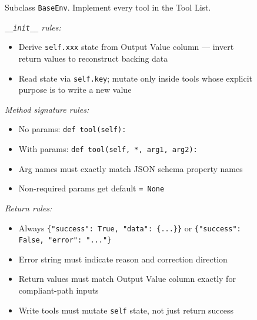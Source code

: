 \begin{figure}[p]
\begin{tcolorbox}[
    enhanced,
    colback=gray!5,
    colframe=black!60,
    arc=2pt,
    boxrule=0.5pt,
    width=\linewidth,
    left=6pt, right=6pt, top=2pt, bottom=4pt,
    parbox=false,
]
\begin{minipage}[t]{0.303\linewidth}
\vspace{2pt}
Subclass \texttt{BaseEnv}. Implement every tool in the Tool List.

\vspace{2pt}
\textit{\texttt{\_\_init\_\_} rules:}
\begin{itemize}[nosep,leftmargin=1em,topsep=1pt,itemsep=0pt]
  \item Derive \texttt{self.xxx} state from Output Value column — invert return values to reconstruct backing data
  \item Read state via \texttt{self.key}; mutate only inside tools whose explicit purpose is to write a new value
\end{itemize}

\vspace{2pt}
\textit{Method signature rules:}
\begin{itemize}[nosep,leftmargin=1em,topsep=1pt,itemsep=0pt]
  \item No params: \texttt{def tool(self):}
  \item With params: \texttt{def tool(self, *, arg1, arg2):}
  \item Arg names must exactly match JSON schema property names
  \item Non-required params get default \texttt{= None}
\end{itemize}

\vspace{2pt}
\textit{Return rules:}
\begin{itemize}[nosep,leftmargin=1em,topsep=1pt,itemsep=0pt]
  \item Always \texttt{\{"success": True, "data": \{...\}\}} or \texttt{\{"success": False, "error": "..."\}}
  \item Error string must indicate reason and correction direction
  \item Return values must match Output Value column exactly for compliant-path inputs
  \item Write tools must mutate \texttt{self} state, not just return success
\end{itemize}


\end{minipage}
\end{tcolorbox}
\end{figure}
